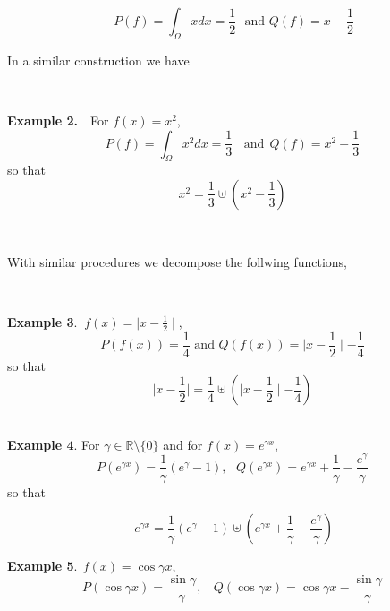 \documentclass{amsproc}
\theoremstyle{plain}
\numberwithin{equation}{section}
\begin{document}
\begin{equation*}
\ P(f)=\int_{\Omega }xdx=\frac{1}{2}\ \ \ \text{and \ \ }Q(f)=x-\frac{1}{2}
\end{equation*}

In a similar construction we have

\ 

\textbf{Example 2.}\ \ For $f\left( x\right) =x^{2}$, $\ $\begin{equation*}
P\left( f\right) =\int_{\Omega }x^{2}dx=\frac{1}{3}\ \ \ \ \text{and}\ \
Q\left( f\right) =x^{2}-\frac{1}{3}
\end{equation*}so that 
\begin{equation*}
x^{2}=\frac{1}{3}\uplus \left( x^{2}-\frac{1}{3}\right)
\end{equation*}

\ 

With similar procedures we decompose the follwing functions,

\ \ \ \ \ \ \ 

\textbf{Example 3}. $\ f(x)=\mid x-\frac{1}{2}\mid $, 
\begin{equation*}
P(f(x))=\frac{1}{4}\text{ \ \ and \ }Q(f(x))=\mid x-\frac{1}{2}\mid -\frac{1}{4}
\end{equation*}
so that 
\begin{equation*}
\mid x-\frac{1}{2}\mid =\frac{1}{4}\uplus \left( \mid x-\frac{1}{2}\mid -\frac{1}{4}\right)
\end{equation*}\ \ \ 

\textbf{Example 4}. For $\gamma \in 
\mathbb{R}
\setminus \{0\}$ and for $f(x)=e^{\gamma x}$, 
\begin{equation*}
P(e^{\gamma x})=\frac{1}{\gamma }\left( e^{\gamma }-1\right) ,\text{ \ }Q(e^{\gamma x})=e^{\gamma x}+\frac{1}{\gamma }-\frac{e^{\gamma }}{\gamma }
\end{equation*}
so that

$\ \ $\begin{equation*}
\ e^{\gamma x}=\frac{1}{\gamma }\left( e^{\gamma }-1\right) \uplus \left(
e^{\gamma x}+\frac{1}{\gamma }-\frac{e^{\gamma }}{\gamma }\right)
\end{equation*}

\textbf{Example 5}.$\ \ f(x)=\cos \gamma x,$ 
\begin{equation*}
P(\cos \gamma x)=\frac{\sin \gamma }{\gamma },\text{ \ }\ Q\left( \cos
\gamma x\right) =\cos \gamma x-\frac{\sin \gamma }{\gamma }
\end{equation*}
\end{document}
